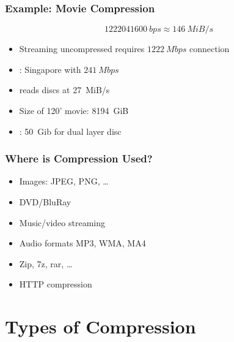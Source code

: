 \begin{frame}
  \frametitle{Example: Movie Compression}
  \[
    \SI{1222041600}{bps} \approx \SI{146}{MiB/s}
  \]
  \vskip5mm
  \begin{itemize}
  \item Streaming uncompressed requires $\SI{1222}{Mbps}$ connection
    \item {}: Singapore with $\SI{241}{Mbps}$
  \end{itemize}
  \vskip5mm
  \begin{itemize}
    \item {} reads discs at \SI{27}{MiB/s}
    \item Size of 120' movie: \SI{8194}{GiB}
    \item {}: \SI{50}{Gib} for dual layer disc
  \end{itemize}
\end{frame}

\begin{frame}
  \frametitle{Where is Compression Used?}
  \begin{itemize}
    \item Images: JPEG, PNG, \dots
    \item DVD/BluRay
    \item Music/video streaming
    \item Audio formats MP3, WMA, MA4
    \item Zip, 7z, rar, \dots
    \item HTTP compression
  \end{itemize}
\end{frame}

\section{Types of Compression}

\frame{\tableofcontents[currentsection]}

